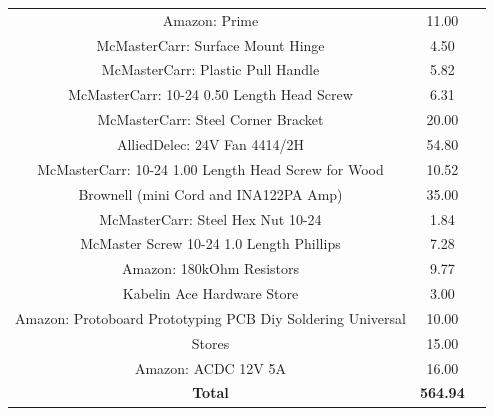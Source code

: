 \documentclass[12pt]{article}
\begin{document}
\begin{table}[B]
\begin{tabular}{ccc}
Amazon: Prime                                                       & 11.00       \\
McMasterCarr: Surface Mount Hinge                                   & 4.50        \\
McMasterCarr: Plastic Pull Handle                                   & 5.82        \\
McMasterCarr: 10-24 0.50 Length Head Screw                          & 6.31        \\
McMasterCarr: Steel Corner Bracket                                  & 20.00       \\
AlliedDelec: 24V Fan 4414/2H                                        & 54.80       \\
McMasterCarr: 10-24 1.00 Length Head Screw for Wood                 & 10.52       \\
Brownell (mini Cord and INA122PA Amp)                               & 35.00       \\
McMasterCarr: Steel Hex Nut 10-24                                   & 1.84        \\
McMaster Screw 10-24 1.0 Length Phillips                            & 7.28        \\
Amazon: 180kOhm Resistors                                           & 9.77        \\
Kabelin Ace Hardware Store                                          & 3.00        \\
Amazon: Protoboard Prototyping PCB Diy Soldering Universal          & 10.00       \\
Stores                                                              & 15.00       \\
Amazon: ACDC 12V 5A                                                 & 16.00      \\
\textbf{Total} 														&
\textbf{564.94}
\end{tabular}
\end{table}
\end{document}
